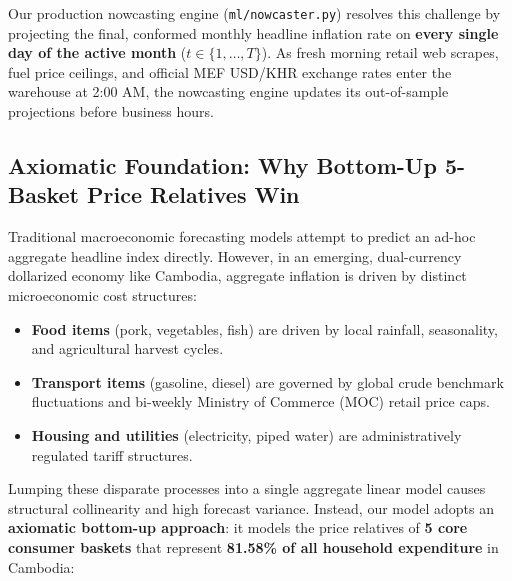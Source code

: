 \documentclass[11pt,a4paper,oneside]{article}
\begin{document}
Our production nowcasting engine (\texttt{ml/nowcaster.py}) resolves this challenge by projecting the final, conformed monthly headline inflation rate on \textbf{every single day of the active month} ($t \in \{1, \dots, T\}$). As fresh morning retail web scrapes, fuel price ceilings, and official MEF USD/KHR exchange rates enter the warehouse at 2:00 AM, the nowcasting engine updates its out-of-sample projections before business hours.

\subsection{Axiomatic Foundation: Why Bottom-Up 5-Basket Price Relatives Win}
Traditional macroeconomic forecasting models attempt to predict an ad-hoc aggregate headline index directly. However, in an emerging, dual-currency dollarized economy like Cambodia, aggregate inflation is driven by distinct microeconomic cost structures:
\begin{itemize}[noitemsep]
    \item \textbf{Food items} (pork, vegetables, fish) are driven by local rainfall, seasonality, and agricultural harvest cycles.
    \item \textbf{Transport items} (gasoline, diesel) are governed by global crude benchmark fluctuations and bi-weekly Ministry of Commerce (MOC) retail price caps.
    \item \textbf{Housing and utilities} (electricity, piped water) are administratively regulated tariff structures.
\end{itemize}

Lumping these disparate processes into a single aggregate linear model causes structural collinearity and high forecast variance. Instead, our model adopts an \textbf{axiomatic bottom-up approach}: it models the price relatives of \textbf{5 core consumer baskets} that represent \textbf{81.58\% of all household expenditure} in Cambodia:
\end{document}
